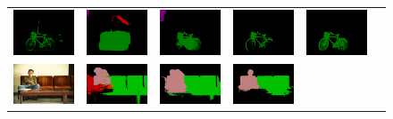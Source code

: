 \begin{figure}[p]
{\begin{tabular}{c c c c c c}
    \includegraphics[height=0.123\linewidth]{fig/val_crf_vis/adaweak/2008_004363.png} &
    \includegraphics[height=0.123\linewidth]{fig/val_crf_vis/bbox/2008_004363.png} &
    \includegraphics[height=0.123\linewidth]{fig/val_crf_vis/bbox_crf/2008_004363.png} &
    \includegraphics[height=0.123\linewidth]{fig/val_crf_vis/strongweak/2008_004363.png} &
    \includegraphics[height=0.123\linewidth]{fig/val_crf_vis/cocomix/2008_004363.png} \\
    \includegraphics[height=0.11\linewidth]{fig/val_crf_vis/img/2009_001299.jpg} &
    \includegraphics[height=0.11\linewidth]{fig/val_crf_vis/adaweak/2009_001299.png} &
    \includegraphics[height=0.11\linewidth]{fig/val_crf_vis/bbox/2009_001299.png} &
    \includegraphics[height=0.11\linewidth]{fig/val_crf_vis/bbox_crf/2009_001299.png} &

\end{tabular}}
\end{figure}

